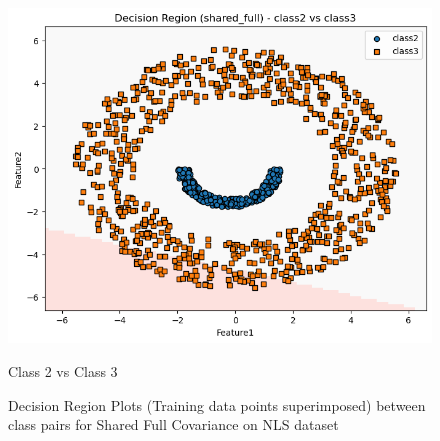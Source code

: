 \begin{figure}[H]
    \begin{minipage}{0.32\linewidth}
        \includegraphics[width=\linewidth]{images/NLS_Group04_images/02_shared_full/04_decision_region_c2_c3.png}
        \caption*{Class 2 vs Class 3}
    \end{minipage}
    \caption{Decision Region Plots (Training data points superimposed) between class pairs for Shared Full Covariance on NLS dataset}
\end{figure}